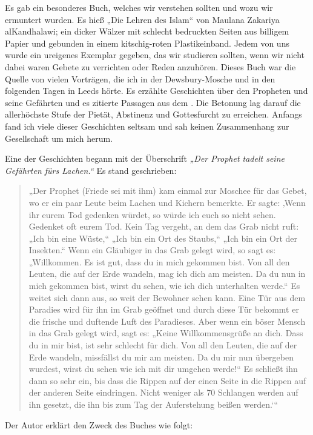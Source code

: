 \documentclass[12pt]{memoir}
\begin{document}
Es gab ein besonderes Buch, welches wir verstehen sollten
und wozu wir ermuntert wurden.
Es hieß „Die Lehren des Islam“ von Maulana Zakariya al\–Kandhalawi;
ein dicker Wälzer mit schlecht bedruckten Seiten aus billigem Papier
und gebunden in einem kitschig-roten Plastikeinband.
Jedem von uns wurde ein ureigenes Exemplar gegeben, das wir studieren sollten,
wenn wir nicht dabei waren Gebete zu verrichten oder Reden anzuhören.
Dieses Buch war die Quelle von vielen Vorträgen,
die ich in der Dewsbury-Mosche und in den folgenden Tagen in Leeds hörte.
Es erzählte Geschichten über den Propheten und seine Gefährten
und es zitierte Passagen aus dem \Quran.
Die Betonung lag darauf die allerhöchste Stufe der Pietät,
Abstinenz und Gottesfurcht zu erreichen.
Anfangs fand ich viele dieser Geschichten seltsam
und sah keinen Zusammenhang zur Gesellschaft um mich herum.

Eine der Geschichten begann mit der Überschrift
\emph{„Der Prophet tadelt seine Gefährten fürs Lachen.“}
Es stand geschrieben:

\begin{quote}
„Der Prophet (Friede sei mit ihm) kam einmal zur Moschee für das Gebet,
wo er ein paar Leute beim Lachen und Kichern bemerkte.
Er sagte: ‚Wenn ihr eurem Tod gedenken würdet,
so würde ich euch so nicht sehen.
Gedenket oft eurem Tod. Kein Tag vergeht, an dem das Grab nicht ruft:
„Ich bin eine Wüste,“ „Ich bin ein Ort des Staubs,“
„Ich bin ein Ort der Insekten.“
Wenn ein Gläubiger in das Grab gelegt wird, so sagt es:
„Willkommen. Es ist gut, dass du in mich gekommen bist.
Von all den Leuten, die auf der Erde wandeln, mag ich dich am meisten.
Da du nun in mich gekommen bist, wirst du sehen,
wie ich dich unterhalten werde.“
Es weitet sich dann aus, so weit der Bewohner sehen kann.
Eine Tür aus dem Paradies wird für ihn im Grab geöffnet
und durch diese Tür bekommt er die frische und duftende Luft des Paradieses.
Aber wenn ein böser Mensch in das Grab gelegt wird, sagt es:
„Keine Willkommensgrüße an dich. Dass du in mir bist,
ist sehr schlecht für dich. Von all den Leuten, die auf der Erde wandeln,
missfällst du mir am meisten.
Da du mir nun übergeben wurdest,
wirst du sehen wie ich mit dir umgehen werde!“
Es schließt ihn dann so sehr ein,
bis dass die Rippen auf der einen Seite
in die Rippen auf der anderen Seite eindringen.
Nicht weniger als 70 Schlangen werden auf ihn gesetzt,
die ihn bis zum Tag der Auferstehung beißen werden.‘“
\end{quote}

Der Autor erklärt den Zweck des Buches wie folgt:
\end{document}
